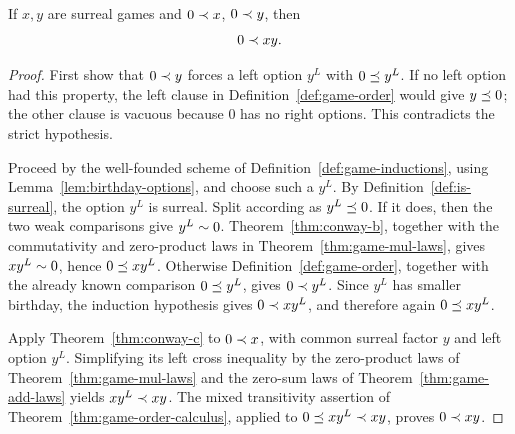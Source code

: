 \begin{theorem}
  \label{thm:game-mul-pos}
  \leanok
  If \(x,y\) are surreal games and \(0\prec x\), \(0\prec y\), then
  \[
    0\prec xy.
  \]
\end{theorem}
\begin{proof}
  \leanok
  First show that \(0\prec y\) forces a left option \(y^L\) with
  \(0\preceq y^L\).  If no left option had this property, the left clause in
  Definition~\ref{def:game-order} would give \(y\preceq0\); the other clause
  is vacuous because \(0\) has no right options.  This contradicts the strict
  hypothesis.

  Proceed by the well-founded scheme of
  Definition~\ref{def:game-inductions}, using
  Lemma~\ref{lem:birthday-options}, and choose such a \(y^L\).  By
  Definition~\ref{def:is-surreal}, the option \(y^L\) is surreal.  Split according as
  \(y^L\preceq0\).  If it does, then the two weak comparisons give
  \(y^L\sim0\).  Theorem~\ref{thm:conway-b}, together with the
  commutativity and zero-product laws in Theorem~\ref{thm:game-mul-laws}, gives
  \(xy^L\sim0\), hence \(0\preceq xy^L\).  Otherwise
  Definition~\ref{def:game-order}, together with the already known comparison
  \(0\preceq y^L\), gives \(0\prec y^L\).  Since \(y^L\) has smaller birthday, the induction
  hypothesis gives \(0\prec xy^L\), and therefore again
  \(0\preceq xy^L\).

  Apply Theorem~\ref{thm:conway-c} to \(0\prec x\), with common surreal
  factor \(y\) and left option \(y^L\).  Simplifying its left cross inequality
  by the zero-product laws of Theorem~\ref{thm:game-mul-laws} and the zero-sum
  laws of Theorem~\ref{thm:game-add-laws} yields
  \(xy^L\prec xy\).  The mixed transitivity assertion of
  Theorem~\ref{thm:game-order-calculus}, applied to
  \(0\preceq xy^L\prec xy\), proves \(0\prec xy\).
\end{proof}

